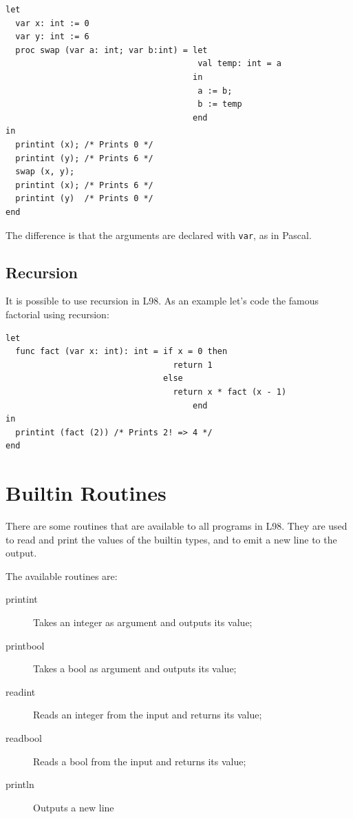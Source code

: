 \documentclass[a4paper, 11pt]{report}
\newcommand{\keyword}[1]{\texttt{#1}}
\begin{document}
\begin{verbatim}
let
  var x: int := 0
  var y: int := 6
  proc swap (var a: int; var b:int) = let
                                       val temp: int = a
                                      in
                                       a := b;
                                       b := temp
                                      end
in
  printint (x); /* Prints 0 */
  printint (y); /* Prints 6 */
  swap (x, y);
  printint (x); /* Prints 6 */
  printint (y)  /* Prints 0 */
end
\end{verbatim}

The difference is that the arguments are declared with \keyword{var}, as in Pascal.

\subsection{Recursion}

It is possible to use recursion in L98. As an example let's code the
famous factorial using recursion:

\begin{verbatim}
let
  func fact (var x: int): int = if x = 0 then
                                  return 1
                                else
                                  return x * fact (x - 1)
                                      end
in
  printint (fact (2)) /* Prints 2! => 4 */
end
\end{verbatim}

\section{Builtin Routines}
\label{sct:builtin}

There are some routines that are available to all programs in L98. They are used
to read and print the values of the builtin types, and to emit a new line to the output.

The available routines are:

\begin{description}
\item[printint] Takes an integer as argument and outputs its value;

\item[printbool] Takes a bool as argument and outputs its value;

\item[readint] Reads an integer from the input and returns its value;

\item[readbool] Reads a bool from the input and returns its value;

\item[println] Outputs a new line
\end{description}
\end{document}
